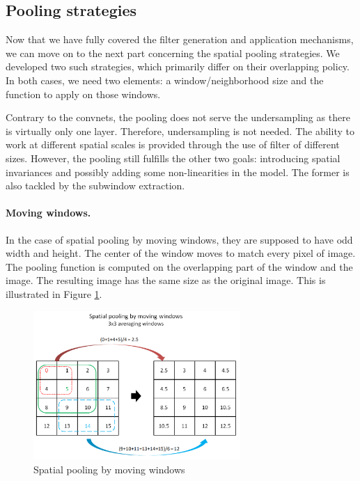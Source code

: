 \documentclass[a4paper]{report}
\begin{document}
			
			
			
		\subsection{Pooling strategies}
		Now that we have fully covered the filter generation and application mechanisms, we can move on to the next part concerning the spatial pooling strategies. 
		We developed two such strategies, which primarily differ on their overlapping policy.
		In both cases, we need two elements: a window/neighborhood size and the function to apply on those windows. 
		\par
		Contrary to the convnets, the pooling does not serve the undersampling as there is virtually only one layer. Therefore, undersampling is not needed. The ability to work at different spatial scales is provided through the use of filter of different sizes.  However, the pooling still fulfills the other two goals: introducing spatial invariances and possibly adding some non-linearities in the model. The former is also tackled by the subwindow extraction.
		
			\paragraph{Moving windows.}
			In the case of spatial pooling by moving windows, they are supposed to have odd width and height. The center of the window moves to match every pixel of image. The pooling function is computed on the overlapping part of the window and the image. The resulting image has the same size as the original image. This is illustrated in Figure \ref{fig:PoolMW}. 
	\begin{figure}
		\centering
			\includegraphics[width=0.7\textwidth]{images/PoolMW.png}
		\caption{\label{fig:PoolMW}Spatial pooling by moving windows}
	\end{figure}
			
\end{document}
